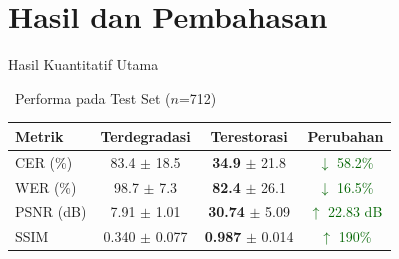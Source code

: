\documentclass[aspectratio=169,10pt,t]{beamer}
\begin{document}
\section{Hasil dan Pembahasan}

\begin{frame}{Hasil Kuantitatif Utama}
    \begin{block}{\faChartBar~Performa pada Test Set ($n$=712)}
        \centering
        \begin{tabular}{lccc}
            \toprule
            \textbf{Metrik} & \textbf{Terdegradasi} & \textbf{Terestorasi} & \textbf{Perubahan} \\
            \midrule
            CER (\%) & 83.4 $\pm$ 18.5 & \textbf{34.9} $\pm$ 21.8 & \textcolor{darkgreen}{$\downarrow$ 58.2\%} \\
            WER (\%) & 98.7 $\pm$ 7.3 & \textbf{82.4} $\pm$ 26.1 & \textcolor{darkgreen}{$\downarrow$ 16.5\%} \\
            PSNR (dB) & 7.91 $\pm$ 1.01 & \textbf{30.74} $\pm$ 5.09 & \textcolor{darkgreen}{$\uparrow$ 22.83 dB} \\
            SSIM & 0.340 $\pm$ 0.077 & \textbf{0.987} $\pm$ 0.014 & \textcolor{darkgreen}{$\uparrow$ 190\%} \\
            \bottomrule
        \end{tabular}
    \end{block}
    

\end{frame}
\end{document}
